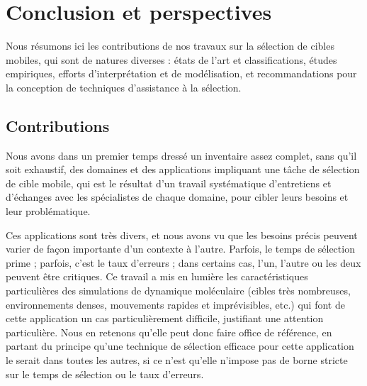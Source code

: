 


\chapter*{Conclusion et perspectives}
\mtcaddchapter %

	Nous résumons ici les contributions de nos travaux sur la sélection de cibles mobiles, qui sont de natures diverses : états de l'art et classifications, études empiriques, efforts d'interprétation et de modélisation, et recommandations pour la conception de techniques d'assistance à la sélection.

	\section*{Contributions}
	Nous avons dans un premier temps dressé un inventaire assez complet, sans qu'il soit exhaustif, des domaines et des applications impliquant une tâche de sélection de cible mobile, qui est le résultat d'un travail systématique d'entretiens et d'échanges avec les spécialistes de chaque domaine, pour cibler leurs besoins et leur problématique.
	
	Ces applications sont très divers, et nous avons vu que les besoins précis peuvent varier de façon importante d'un contexte à l'autre. Parfois, le temps de sélection prime ; parfois, c'est le taux d'erreurs ; dans certains cas, l'un, l'autre ou les deux peuvent être critiques. Ce travail a mis en lumière les caractéristiques particulières des simulations de dynamique moléculaire (cibles très nombreuses, environnements denses, mouvements rapides et imprévisibles, etc.) qui font de cette application un cas particulièrement difficile, justifiant une attention particulière. Nous en retenons qu'elle peut donc faire office de référence, en partant du principe qu'une technique de sélection efficace pour cette application le serait dans toutes les autres, si ce n'est qu'elle n'impose pas de borne stricte sur le temps de sélection ou le taux d'erreurs.
	
